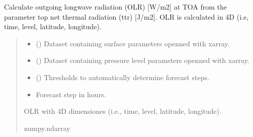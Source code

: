 \documentclass[a4paper,11pt,english]{sphinxmanual}
\begin{document}

\begin{fulllineitems}
\label{\detokenize{modules:envlib.processing_surf_vars.get_olr_4d}}
\pysigstartsignatures
{}
\pysigstopsignatures
\sphinxAtStartPar
Calculate outgoing longwave radiation (OLR) {[}W/m2{]} at TOA from the parameter top net thermal radiation (ttr)
{[}J/m2{]}. OLR is calculated in 4D (i.e, time, level, latitude, longitude).
\begin{quote}\begin{description}
\begin{itemize}
\item {} 
\sphinxAtStartPar
{} () \textendash{} Dataset containing surface parameters openned with xarray.

\item {} 
\sphinxAtStartPar
{} () \textendash{} Dataset containing pressure level parameters openned with xarray.

\item {} 
\sphinxAtStartPar
{} () \textendash{} Thresholds to automatically determine forecast steps.

\item {} 
\sphinxAtStartPar
{} \textendash{} Forecast step in hours.

\end{itemize}

\sphinxAtStartPar
OLR with 4D dimensiones (i.e., time, level, latitude, longitude).

\sphinxAtStartPar
numpy.ndarray

\end{description}\end{quote}

\end{fulllineitems}
\end{document}

